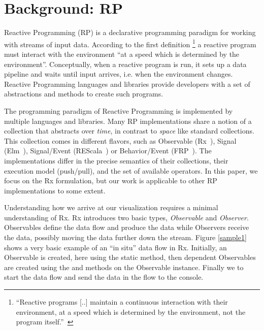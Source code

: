 \section{Background:  RP}%
\label{background}%
\label{nutshell}

Reactive Programming (RP) is a declarative programming paradigm for
working with streams of input data.  According to the first definition%
\footnote{ ``Reactive programs [..] maintain a continuous interaction
with their environment, at a speed which is determined by the
environment, not the program itself.''~\cite{berry1989real} } a reactive
program must interact with the environment ``at a speed which is
determined by the environment''.  Conceptually, when a reactive program
is run, it sets up a data pipeline and waits until input arrives, i.e.
when the environment changes.  Reactive Programming languages and
libraries provide developers with a set of abstractions and methods to
create such programs.

The programming paradigm of Reactive Programming is implemented by
multiple languages and libraries.  Many RP implementations share a
notion of a collection that abstracts over \emph{time}, in contrast to
\emph{space} like standard collections.  This collection comes in
different flavors, such as Observable (Rx~\cite{meijer2010subject}),
Signal (Elm~\cite{czaplicki2012elm}), Signal/Event (REScala~\cite{salvaneschi2014rescala})
or Behavior/Event (FRP~\cite {elliott1997functional}).  The
implementations differ in the precise semantics of their collections,
their execution model (push/pull), and the set of available operators.
In this paper, we focus on the Rx formulation, but our work is
applicable to other RP implementations to some extent.

Understanding how we arrive at our visualization requires a minimal
understanding of Rx.  Rx introduces two basic types, \emph{Observable}
and \emph{Observer}.  Observables define the data flow and produce the
data while Observers receive the data, possibly moving the data further
down the stream.  Figure%
\ref{sample1} shows a very basic example of an ``in situ'' data flow in
Rx.  Initially, an Observable is created, here using the static 
method, then dependent Observables are created using the  and
 methods on the Observable instance.  Finally we 
to start the data flow and send the data in the flow to the console.

